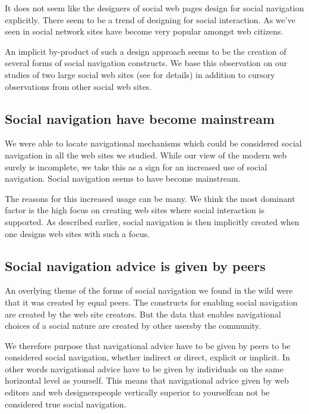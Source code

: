 It does not seem like the designers of social web pages design for social
navigation explicitly. There seem to be a trend of designing for social
interaction.
As we've seen in
social network sites have become very popular amongst web citizens.

An implicit by-product of such a design approach seems to be
the creation of several forms of social navigation constructs.
We base this observation on our studies of two large social web sites
(see  for details)
in addition to cursory observations from other social web sites.

\subsection{Social navigation have become mainstream}

We were able to locate navigational mechanisms which could be considered
social navigation in all the web sites we studied. While our view of the
modern web surely is incomplete, we take this as a sign for an increased use
of social navigation. Social navigation seems to have become mainstream.

The reasons for this increased usage can be many. We think the most dominant
factor is the high focus on creating web sites where social interaction is
supported. As described earlier, social navigation is then implicitly created
when one designs web sites with such a focus.

\subsection{Social navigation advice is given by peers}

An overlying theme of the forms of social navigation we found in the wild were
that it was created by equal peers. The constructs for enabling social
navigation are created by the web site creators. But the data that
enables navigational choices of a social nature are created by other
users\dash{}by the community.

We therefore purpose that navigational advice have to
be given by peers to be considered social navigation,
whether indirect or direct, explicit or implicit.
In other words
navigational advice have to be given by individuals on the same horizontal
level as yourself. This means that navigational advice given by web editors
and web designers\dash{}people vertically superior to yourself\dash{}can not
be considered true social navigation.

